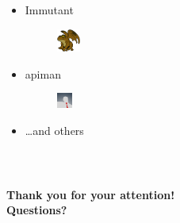 \documentclass[10pt,utf8]{beamer}
\begin{document}
\begin{frame}
\begin{columns}
\begin{itemize}
\begin{figure}
				\end{figure}
			\item Immutant
				\hspace{10cm}
				\begin{figure}
					\vspace{-1cm}
					\includegraphics[height=0.75cm]{./img/immutant.eps}
				\end{figure}
			\item apiman
				\hspace{10cm}
				\begin{figure}
					\vspace{-1cm}
					\includegraphics[height=0.5cm]{./img/apiman.eps}
				\end{figure}
			\item \dots and others
		\end{itemize}
	\end{columns}
\end{frame}


\begin{frame}
	\centering
	\huge{} \\
	\vspace{1cm}
	\huge{\textbf{Thank you for your attention!}} \\
	\vspace{1cm}
	\huge{\textbf{Questions?}}
\end{frame}
\end{document}
